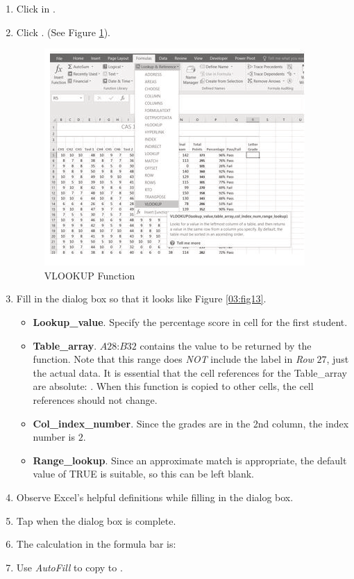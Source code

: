 \begin{enumbox}
	\begin{enumerate}
		\item Click in .
		\item Click . (See Figure \ref{03:fig12}).

		\begin{figure}[H]
			\centering
			\includegraphics[width=\maxwidth{.95\linewidth}]{gfx/ch03_fig12}
			\caption{VLOOKUP Function}
			\label{03:fig12}
		\end{figure}
		
		\item Fill in the dialog box so that it looks like Figure \ref{03:fig13}.
		
		\begin{itemize}
			\item \textbf{Lookup\_value}. Specify the percentage score in cell  for the first student.
			\item \textbf{Table\_array}. $ A28 $:$ B32 $ contains the value to be returned by the function. Note that this range does \textit{NOT} include the label in \textit{Row} $ 27 $, just the actual data. It is essential that the cell references for the Table\_array are absolute: . When this function is copied to other cells, the cell references should not change.
			\item \textbf{Col\_index\_number}. Since the grades are in the 2nd column, the index number is $ 2 $.
			\item \textbf{Range\_lookup}. Since an approximate match is appropriate, the default value of TRUE is suitable, so this can be left blank.  
		\end{itemize}

		\item Observe Excel's helpful definitions while filling in the  dialog box.
		\item Tap  when the dialog box is complete.
		\item The calculation in the formula bar is: 
		\item Use \textit{AutoFill} to copy  to .
	\end{enumerate}
\end{enumbox}
	
